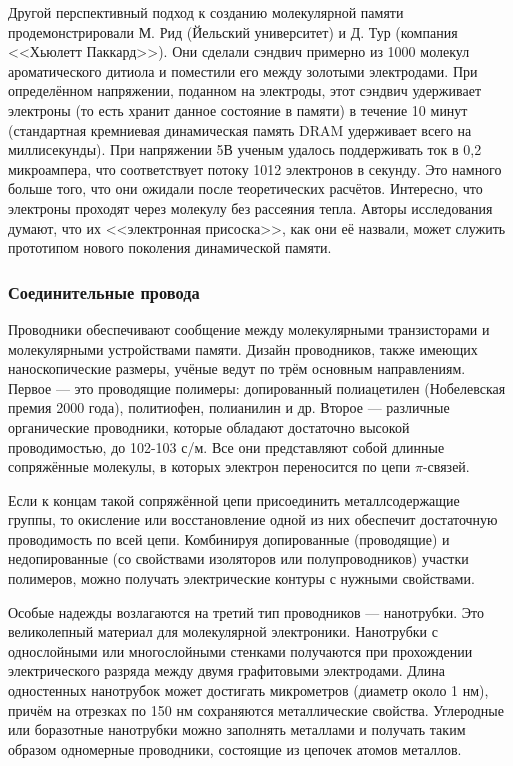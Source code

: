 \documentclass[titlepage, 12pt]{article}
\begin{document}
Другой перспективный подход к созданию молекулярной памяти продемонстрировали М. Рид (Йельский университет) и Д. Тур (компания <<Хьюлетт Паккард>>). Они сделали сэндвич примерно из 1000 молекул ароматического дитиола и поместили его между золотыми электродами. При определённом напряжении, поданном на электроды, этот сэндвич удерживает электроны (то есть хранит данное состояние в памяти) в течение 10 минут (стандартная кремниевая динамическая память DRAM удерживает всего на миллисекунды). При напряжении 5В ученым удалось поддерживать ток в 0,2 микроампера, что соответствует потоку 1012 электронов в секунду. Это намного больше того, что они ожидали после теоретических расчётов. Интересно, что электроны проходят через молекулу без рассеяния тепла. Авторы исследования думают, что их <<электронная присоска>>, как они её назвали, может служить прототипом нового поколения динамической памяти.


\subsubsection{Соединительные провода}
Проводники обеспечивают сообщение между молекулярными транзисторами и молекулярными устройствами памяти. Дизайн проводников, также имеющих наноскопические размеры, учёные ведут по трём основным направлениям. Первое — это проводящие полимеры: допированный полиацетилен (Нобелевская премия 2000 года), политиофен, полианилин и др. Второе — различные органические проводники, которые обладают достаточно высокой проводимостью, до 102-103 с/м. Все они представляют собой длинные сопряжённые молекулы, в которых электрон переносится по цепи $\pi$-связей. 

Если к концам такой сопряжённой цепи присоединить металлсодержащие группы, то окисление или восстановление одной из них обеспечит достаточную проводимость по всей цепи. Комбинируя допированные (проводящие) и недопированные (со свойствами изоляторов или полупроводников) участки полимеров, можно получать электрические контуры с нужными свойствами.

Особые надежды возлагаются на третий тип проводников — нанотрубки. Это великолепный материал для молекулярной электроники. Нанотрубки с однослойными или многослойными стенками получаются при прохождении электрического разряда между двумя графитовыми электродами. Длина одностенных нанотрубок может достигать микрометров (диаметр около 1 нм), причём на отрезках по 150 нм сохраняются металлические свойства. Углеродные или боразотные нанотрубки можно заполнять металлами и получать таким образом одномерные проводники, состоящие из цепочек атомов металлов. 
\end{document}
